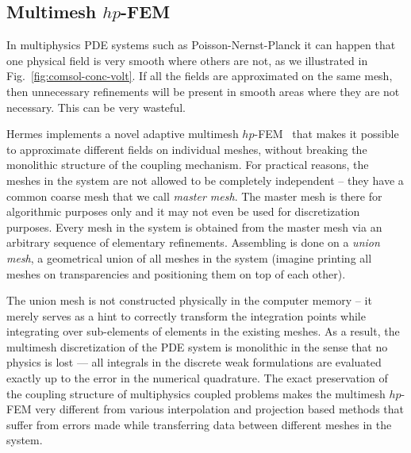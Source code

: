 \subsection{Multimesh $hp$-FEM}
In multiphysics PDE systems such as Poisson-Nernst-Planck it can 
happen that one physical field is very smooth where others are not,
as we illustrated in Fig.~\ref{fig:comsol-conc-volt}. 
If all the fields are approximated on the same mesh, then 
unnecessary refinements will be present in smooth areas
where they are not necessary. This can be very wasteful.

Hermes implements a novel adaptive multimesh $hp$-FEM~\cite{solin2010monolithic,
solin2010adaptive,dubcova2010space}
that makes it possible to approximate different fields on individual meshes,
without breaking the monolithic structure of the coupling mechanism.
For practical reasons, the meshes in the system are not allowed to be 
completely independent -- they have a common coarse mesh that we call {\em 
master mesh}. The master mesh is 
there for algorithmic purposes only and it may not even be used for 
discretization purposes. Every mesh in the system is obtained from 
the master mesh via an arbitrary sequence of elementary refinements. 
Assembling is done on a {\em union mesh}, a geometrical union of 
all meshes in the system (imagine printing all meshes on transparencies and 
positioning them on top of each other). 

The union mesh is not constructed physically in the computer 
memory -- it merely serves as a hint to correctly transform the 
integration points while integrating over sub-elements of elements 
in the existing meshes. 
As a result, the multimesh discretization of the PDE system is 
monolithic in the sense that no physics is lost --- all integrals 
in the discrete weak formulations are evaluated exactly up to 
the error in the numerical quadrature. The exact preservation of 
the coupling structure of multiphysics coupled problems makes 
the multimesh $hp$-FEM very different from various interpolation 
and projection based methods that suffer from errors made
while transferring data between different meshes in the system. 



